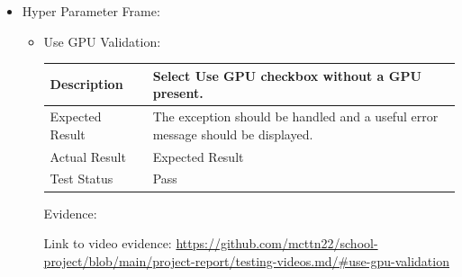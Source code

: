 \documentclass[./project-report/src/latex/project-report.tex]{subfiles}
\begin{document}
\begin{itemize}
    \item Hyper Parameter Frame:
    \label{sec:hyper-parameter-frame-input-validation}
    \begin{itemize}
        \item Use GPU Validation: \newline\newline
			\begin{tabular}{|p{0.25\linewidth}|p{0.75\linewidth}|}
				\hline
				Description & Select Use GPU checkbox without a GPU present. \\
				\hline
				Expected Result & The exception should be handled and a useful error message should be displayed. \\
				\hline
				Actual Result & Expected Result \\
				\hline
				Test Status & Pass \\
				\hline
			\end{tabular}

			\vspace{5mm}

			Evidence:
			\begin{figure}[h!]
			\centering
			\end{figure}

			Link to video evidence: \url{https://github.com/mcttn22/school-project/blob/main/project-report/testing-videos.md/#use-gpu-validation}

        \pagebreak


\end{itemize}
\end{itemize}
\end{document}
